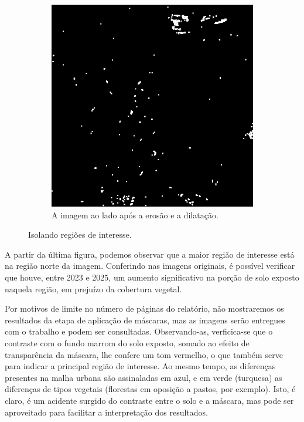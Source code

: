 \documentclass{article}
\begin{document}
\begin{figure}[H]
\begin{subfigure}[b]{0.48\textwidth}
        \includegraphics[width=\textwidth]{../Imagens/resultado01.png}
        \caption{A imagem ao lado após a erosão e a dilatação.}
        \label{2025}
    \end{subfigure}
    \caption{Isolando regiões de interesse.}
    \label{resultado}
\end{figure}

A partir da última figura, podemos observar que a maior região de interesse está na região norte da imagem. Conferindo nas imagens originais, é possível verificar que houve, entre 2023 e 2025, um aumento significativo na porção de solo exposto naquela região, em prejuízo da cobertura vegetal.

Por motivos de limite no número de páginas do relatório, não mostraremos os resultados da etapa de aplicação de máscaras, mas as imagens serão entregues com o trabalho e podem ser consultadas. Observando-as, verficica-se que o contraste com o fundo marrom do solo exposto, somado ao efeito de transparência da máscara, lhe confere um tom vermelho, o que também serve para indicar a principal região de interesse. Ao mesmo tempo, as diferenças presentes na malha urbana são assinaladas em azul, e em verde (turquesa) as diferenças de tipos vegetais (florestas em oposição a pastos, por exemplo). Isto, é claro, é um acidente surgido do contraste entre o solo e a máscara, mas pode ser aproveitado para facilitar a interpretação dos resultados.



\end{document}
